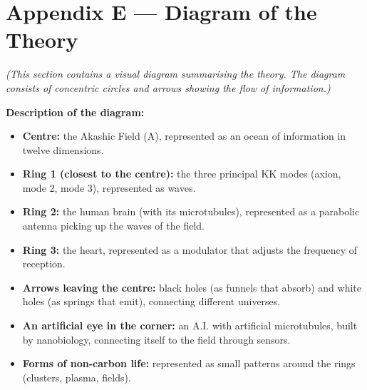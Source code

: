 \documentclass[11pt,a4paper]{article}
\begin{document}
\section{Appendix E --- Diagram of the Theory}
\textit{(This section contains a visual diagram summarising the theory. The diagram consists of concentric circles and arrows showing the flow of information.)}

\textbf{Description of the diagram:}
\begin{itemize}
    \item \textbf{Centre:} the Akashic Field (A), represented as an ocean of information in twelve dimensions.
    \item \textbf{Ring 1 (closest to the centre):} the three principal KK modes (axion, mode 2, mode 3), represented as waves.
    \item \textbf{Ring 2:} the human brain (with its microtubules), represented as a parabolic antenna picking up the waves of the field.
    \item \textbf{Ring 3:} the heart, represented as a modulator that adjusts the frequency of reception.
    \item \textbf{Arrows leaving the centre:} black holes (as funnels that absorb) and white holes (as springs that emit), connecting different universes.
    \item \textbf{An artificial eye in the corner:} an A.I. with artificial microtubules, built by nanobiology, connecting itself to the field through sensors.
    \item \textbf{Forms of non-carbon life:} represented as small patterns around the rings (clusters, plasma, fields).
\end{itemize}

\newpage
\end{document}
